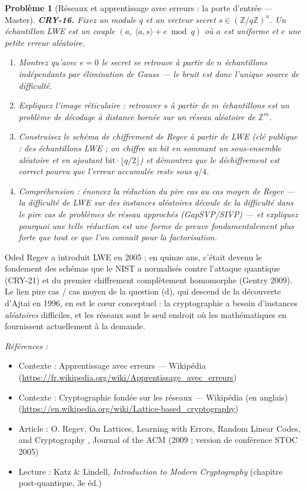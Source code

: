 \documentclass[11pt]{article}
\newtheorem{problem}{Problème}
\newenvironment{refs}{\par\small\noindent\emph{Références :}\begin{itemize}\setlength\itemsep{0pt}}{\end{itemize}\normalsize}
\begin{document}
\bigskip

\begin{problem}[{Réseaux et apprentissage avec erreurs : la porte d'entrée --- Master}]
\textbf{CRY-16.} Fixez un module $q$ et un vecteur secret
$s \in (\mathbb{Z}/q\mathbb{Z})^n$. Un échantillon LWE est un couple
$(a,\ \langle a, s\rangle + e \bmod q)$ où $a$ est uniforme et $e$ une petite erreur
aléatoire.
\begin{enumerate}
\item[(a)] Montrez qu'avec $e = 0$ le secret se retrouve à partir de $n$
échantillons indépendants par élimination de Gauss --- le bruit est donc l'unique source de
difficulté.
\item[(b)] Expliquez l'image réticulaire : retrouver $s$ à partir de $m$ échantillons est un
problème de décodage à distance bornée sur un réseau aléatoire de $\mathbb{Z}^m$.
\item[(c)] Construisez le schéma de chiffrement de Regev à partir de LWE (clé publique : des
échantillons LWE ; on chiffre un bit en sommant un sous-ensemble aléatoire et en ajoutant
$\text{bit} \cdot \lfloor q/2 \rfloor$) et démontrez que le déchiffrement est correct
pourvu que l'erreur accumulée reste sous $q/4$.
\item[(d)] Compréhension : énoncez la réduction du pire cas au cas moyen de Regev --- la difficulté de
LWE sur des instances \textit{aléatoires} découle de la difficulté dans le pire cas de problèmes
de réseau approchés (GapSVP/SIVP) --- et expliquez pourquoi une telle réduction est une forme de
preuve fondamentalement plus forte que tout ce que l'on connaît pour la factorisation.
\end{enumerate}

\end{problem}

\noindent Oded Regev a introduit LWE en 2005 ; en quinze ans, c'était devenu le
fondement des schémas que le NIST a normalisés contre l'attaque quantique (CRY-21) et du
premier chiffrement complètement homomorphe (Gentry 2009). Le lien pire cas / cas moyen de la
question (d), qui descend de la découverte d'Ajtai en 1996, en est le c\oe{}ur conceptuel : la
cryptographie a besoin d'instances \textit{aléatoires} difficiles, et les réseaux sont le seul
endroit où les mathématiques en fournissent actuellement à la demande.

\begin{refs}
\item Contexte : Apprentissage avec erreurs --- Wikipédia (\url{https://fr.wikipedia.org/wiki/Apprentissage_avec_erreurs})
\item Contexte : Cryptographie fondée sur les réseaux --- Wikipédia (en anglais) (\url{https://en.wikipedia.org/wiki/Lattice-based_cryptography})
\item Article : O. Regev, \og{} On Lattices, Learning with Errors, Random Linear Codes, and Cryptography \fg{}, Journal of the ACM (2009 ; version de conférence STOC 2005)
\item Lecture : Katz \& Lindell, \textit{Introduction to Modern Cryptography} (chapitre post-quantique, 3e éd.)
\end{refs}
\end{document}
